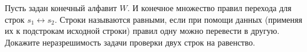 Пусть задан конечный алфавит $W$. И конечное множество правил перехода для строк $s_1 \leftrightarrow
s_2$. Строки называются равными, если при помощи данных (применяя их к подстрокам исходной строки) правил
одну можно перевести в другую. Докажите неразрешимость задачи проверки двух строк на равенство.